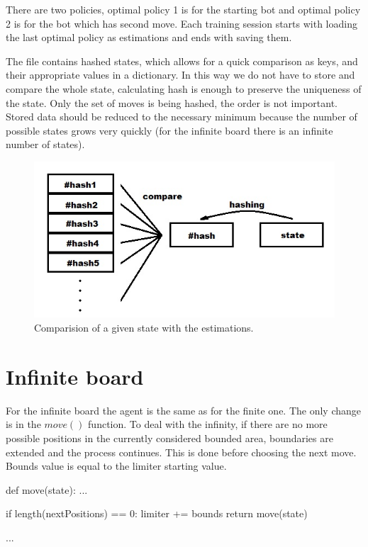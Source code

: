 \documentclass[a4paper,12pt]{book}
\begin{document}
There are two policies, optimal policy 1 is for the starting bot and optimal policy 2 is for the bot which has second move. Each training session starts with loading the last optimal policy as estimations and ends with saving them. 

The file contains hashed states, which allows for a quick comparison as keys, and their appropriate values in a dictionary. In this way we do not have to store and compare the whole state, calculating hash is enough to preserve the uniqueness of the state. Only the set of moves is being hashed, the order is not important. Stored data should be reduced to the necessary minimum because the number of possible states grows very quickly (for the infinite board there is an infinite number of states).

\begin{figure}[!h]
\includegraphics{./Images/hashing.jpg}
	\centering
	\caption{Comparision of a given state with the estimations.}
	\label{fig:Capture1}
\end{figure}

	\section{Infinite board}

For the infinite board the agent is the same as for the finite one. The only change is in the $move()$ function. To deal with the infinity, if there are no more possible positions in the currently considered bounded area, boundaries are extended and the process continues. This is done before choosing the next move. Bounds value is equal to the limiter starting value.

\begin{python}
def move(state):
	...

	if length(nextPositions) == 0:
		limiter += bounds
		return move(state)

	...
\end{python}
\end{document}
